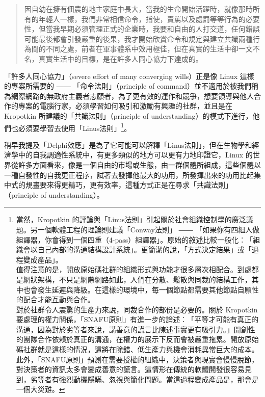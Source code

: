 \documentclass[12pt, a5paper]{book}
\begin{document}
\begin{quote}
因自幼在擁有佃農的地主家庭中長大，當我的生命開始活躍時，就像那時所有的年輕人一樣，我們非常相信命令，指使，責罵以及處罰等等行為的必要性，但當我早期必須管理正式的企業時，我要和自由的人打交道，任何錯誤可能最後都會引發嚴重的後果，我才開始欣賞命令和規定與建立共識兩種行為間的不同之處，前者在軍事體系中效用極佳，但在真實的生活中卻一文不名，真實生活中的目標，是在許多人同心協力下達成的。
\end{quote}

「許多人同心協力」（severe effort of many converging wills）正是像 Linux
這樣的專案所需要的 ―― 「命令法則」（principle of
command）並不適用於被我們稱為網際網路的無政府主義者志願者，為了更有效的運作和競爭，想要領導與他人合作的專案的電腦行家，必須學習如何吸引和激勵有興趣的社群，並且是在
Kropotkin 所建議的「共識法則」（principle of
understanding）的模式下進行，他們也必須要學習去使用「Linus法則」\footnote{當然，Kropotkin
  的評論與「Linus法則」引起關於社會組織控制學的廣泛議題。另一個軟體工程的理論則建議「Conway法則」
  ――
  「如果你有四組人做組譯器，你會得到一個四重（4-pass）組譯器」。原始的敘述比較一般化︰「組織會以自己內部的溝通結構設計系統」。更簡潔的說，「方式決定結果」或「過程變成產品」。\\值得注意的是，開放原始碼社群的組織形式與功能才很多層次相配合。到處都是網狀架構，不只是網際網路如此，人們在分散、鬆散與同裁的結構工作，其中也會發生延遲與降級。在這樣的環境中，每一個節點都需要其他節點自願性的配合才能互動與合作。\\對於社群令人震驚的生產力來說，同裁合作的部份是必要的。關於
  Kropotkin
  要處理的權力關係，「SNAFU原則」有進一步的論述︰「平等才可能有真正的溝通，因為對於劣等者來說，講善意的謊言比陳述事實更有吸引力。」開創性的團隊合作依賴於真正的溝通，在權力的展示下反而會被嚴重拖累。開放原始碼社群就是這樣的情況，這將在除錯、低生產力與機會消耗異常巨大的成本。\\此外，「SNAFU原則」預測在需要授權的組織中，決策者與現實會慢慢脫節，對決策者的資訊太多會變成善意的謊言。這情形在傳統的軟體開發很容易見到，劣等者有強烈動機隱瞞、忽視與簡化問題。當這過程變成產品是，那會是一個大災難。}。

稍早我提及「Delphi效應」是為了它可能可以解釋「Linus法則」，但在生物學和經濟學中的自我調適性系統中，有更多類似的地方可以更有力地印證它，Linux
的世界從許多方面看來，像是一個自由的市場或生態，由一群個體所組成，這些個體以一種自發性的自我更正程序，試著去發揮他最大的功用，所發揮出來的功用比起集中式的規畫要來得更精巧，更有效率，這種方式正是在尋求「共識法則」（principle
of understanding）。
\end{document}
